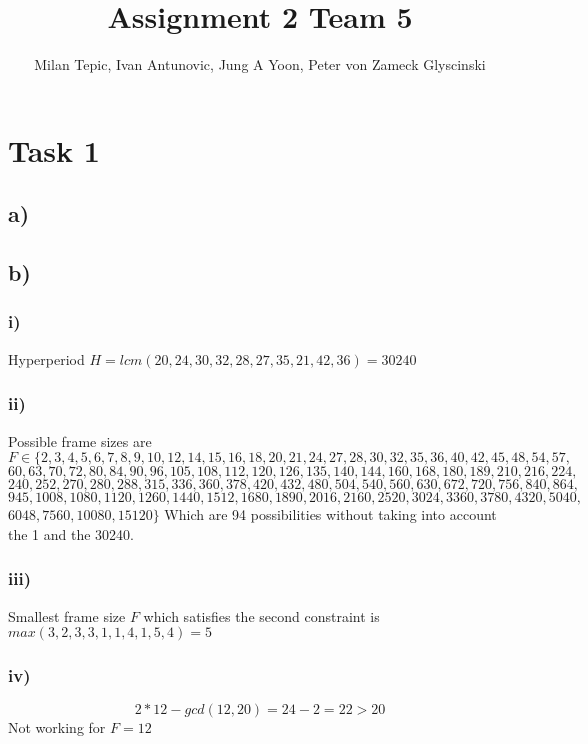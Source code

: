\documentclass[10pt,a4paper]{article}
\author{Milan Tepic, Ivan Antunovic, Jung A Yoon, Peter von Zameck Glyscinski}
\title{Assignment 2 Team 5}
\begin{document}
\maketitle

\section*{Task 1}
\subsection*{a)}
\subsection*{b)}
\subsubsection*{i)}
Hyperperiod $H = lcm(20,24,30,32,28,27,35,21,42,36) = 30240$

\subsubsection*{ii)}
Possible frame sizes are
\newline
$F\in \{2, 3, 4, 5, 6, 7, 8, 9, 10, 12, 14, 15, 16, 18, 20, 21, 24, 27, 28, 30, 32, 35, 36, 40, 42, 45, 48, 54, 57,$
$60, 63, 70, 72, 80, 84, 90, 96, 105, 108, 112, 120, 126, 135, 140, 144, 160, 168, 180, 189, 210, 216, 224,$
$240, 252, 270, 280, 288, 315, 336, 360, 378, 420, 432, 480, 504, 540, 560, 630, 672, 720, 756, 840, 864,$
$945, 1008, 1080, 1120, 1260, 1440, 1512, 1680, 1890, 2016, 2160, 2520, 3024, 3360, 3780, 4320, 5040,$
$6048, 7560, 10080, 15120\}$
\newline
Which are 94 possibilities without taking into account the 1 and the 30240.

\subsubsection*{iii)}
Smallest frame size $F$ which satisfies the second constraint is $max(3, 2, 3, 3, 1, 1, 4, 1, 5, 4) = 5$

\subsubsection*{iv)}
\begin{equation}
2 * 12 - gcd(12, 20) = 24 - 2 = 22 > 20
\end{equation}
Not working for $F=12$
\end{document}
